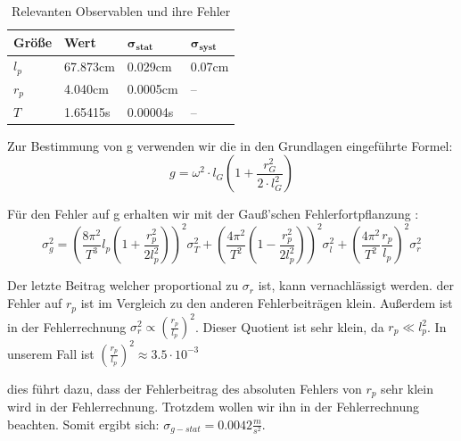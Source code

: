 \documentclass[twoside]{protokoll}
\begin{document}
\begin{table}[H]
        \centering
        \begin{tabularx}{1.0\textwidth}{X X X X} %
            \toprule
            \textbf{Größe} & \textbf{Wert} & $\mathbf{\sigma_{stat}}$ & $\mathbf{\sigma_{syst}}$ \\
            \midrule
            $l_p$ & 67.873cm & 0.029cm & 0.07cm \\
            $r_p$ & 4.040cm & 0.0005cm & --\\
            $T$ & 1.65415s & 0.00004s & --\\
            \bottomrule
        \end{tabularx}
        \caption{Relevanten Observablen und ihre Fehler}
        \label{tab:längen un fehler}
    \end{table}
    
 Zur Bestimmung von g verwenden wir die in den Grundlagen eingeführte Formel:
\begin{equation}
    g = \omega^2 \cdot l_G \left( 1 + \frac{r_G^2}{2 \cdot l_G^2} \right)
    \label{eq:pendel_g}
\end{equation}

Für den Fehler auf g erhalten wir mit der Gauß'schen Fehlerfortpflanzung :
\begin{equation}
\sigma_g^2 = \left(\frac{8\pi^2}{T^3}l_p\left(1+\frac{r_p^2}{2l_p^2}\right)\right)^2 \sigma_T^2 + \left(\frac{4\pi^2}{T^2}\left(1-\frac{r_p^2}{2l_p^2}\right)\right)^2\sigma_l^2 + \left(\frac{4\pi^2}{T^2}\frac{r_p}{l_p}\right)^2\sigma_r^2 
\end{equation}

Der letzte Beitrag welcher proportional zu $\sigma_r$ ist, kann vernachlässigt werden. 
der Fehler auf $r_p$ ist im Vergleich zu den anderen Fehlerbeiträgen klein. 
Außerdem ist in der Fehlerrechnung $\sigma_r^2 \propto \left(\frac{r_p}{l_p}\right)^2$.
Dieser Quotient ist sehr klein, da $ r_p \ll l_p^2 $. 
In unserem Fall ist $\left(\frac{r_p}{l_p}\right)^2 \approx 3.5\cdot10^{-3} $

dies führt dazu, dass der Fehlerbeitrag des absoluten Fehlers von $r_p$ sehr klein wird in der Fehlerrechnung.
Trotzdem wollen wir ihn in der Fehlerrechnung beachten. Somit ergibt sich: $\sigma_{g-stat} = 0.0042 \frac{m}{s^2}$.
\end{document}
